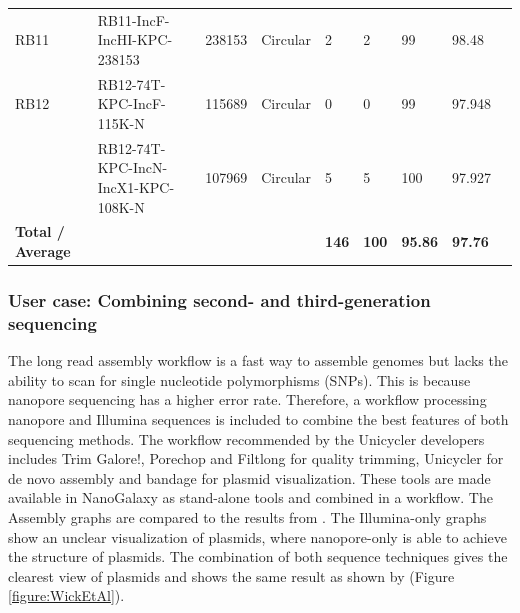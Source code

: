 \documentclass[a4paper,num-refs]{oup-contemporary}
\begin{document}
\begin{landscape}
\begin{table}
\begin{tabular}{l l l l l l l l l}
RB11                     & RB11-IncF-IncHI-KPC-238153         & 238153        & Circular            & 2                                & 2                                        & 99                & 98.48             &                   \\
RB12                     & RB12-74T-KPC-IncF-115K-N           & 115689        & Circular            & 0                                & 0                                        & 99                & 97.948            &                   \\
                         & RB12-74T-KPC-IncN-IncX1-KPC-108K-N & 107969        & Circular            & 5                                & 5                                        & 100               & 97.927            &                   \\
\midrule
\textbf{Total / Average} & \textbf{}                          & \textbf{}     & \textbf{}           & \textbf{146}                     & \textbf{100}                             & \textbf{95.86}    & \textbf{97.76}    & \textbf{}        \\
\bottomrule
\end{tabular}
\end{table}
\end{landscape}

\subsubsection{User case: Combining second- and third-generation sequencing}
The long read assembly workflow is a fast way to assemble genomes but lacks the ability to scan for single nucleotide polymorphisms (SNPs). This is because nanopore sequencing has a higher error rate. Therefore, a workflow processing nanopore and Illumina sequences is included to combine the best features of both sequencing methods. The workflow recommended by the Unicycler developers \cite{Wick2017} includes Trim Galore!, Porechop and Filtlong for quality trimming, Unicycler for de novo assembly and bandage for plasmid visualization. These tools are made available in NanoGalaxy as stand-alone tools and combined in a workflow. The Assembly graphs are compared to the results from \citet{Wick2017}. The Illumina-only graphs show an unclear visualization of plasmids, where nanopore-only is able to achieve the structure of plasmids. The combination of both sequence techniques gives the clearest view of plasmids and shows the same result as shown by \citet{Wick2017} (Figure \ref{figure:WickEtAl}).
\end{document}
